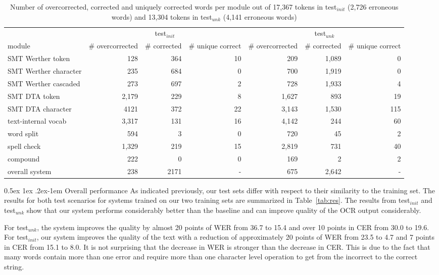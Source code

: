 \documentclass[11pt,letterpaper]{article}
\makeatletter
\renewcommand{\paragraph}{%
  \@startsection{paragraph}{4}%
  {\z@}{0.5ex \@plus 1ex \@minus .2ex}{-1em}%
  {\normalfont\normalsize\bfseries}%
}
\makeatother
\begin{document}
\begin{table*}[h]
\begin{tiny}
\begin{tabular}{l|rrr|rrr}
& \multicolumn{3}{c|}{\small test$_{init}$}& \multicolumn{3}{c}{\small test$_{unk}$}\\
\small
module& \small \# overcorrected & \small\# corrected &\small \# unique correct&\small \# overcorrected &\small \# corrected &\small \# unique correct\\
\toprule
\tiny
SMT Werther token & 128 &  364& 10&209 &1,089 &0 \\
SMT Werther character  & 235 & 684 & 0 &700 & 1,919&0 \\
SMT Werther cascaded & 273 & 697 & 2 &728&1,933&4\\
SMT DTA token & 2,179 & 229 & 8 &1,627 & 893&19\\
SMT DTA character & 4121 & 372 & 22 &3,143 &1,530 &115\\
text-internal vocab & 3,317 & 131 & 16& 4,142 & 244&60\\
word split & 594 & 3 & 0 & 720& 45&2\\
spell check & 1,329 & 219 & 15 &2,819 & 731&40\\
compound & 222 & 0 & 0 &169&2&2\\
\midrule
overall system  & 238 & 2171 & - & 675 & 2,642 & - \\
\bottomrule
\end{tabular} 
\caption{Number of overcorrected, corrected and uniquely corrected words per module out of 17,367 tokens in test$_{init}$ (2,726 erroneous words) and 13,304 tokens in test$_{unk}$ (4,141 erroneous words)}
\label{tab:evalothermod}
\end{tiny}
\end{table*}

\noindent
\paragraph{Overall performance}
As indicated previously, our test sets differ with respect to their similarity to the training set. The results for both test scenarios for systems trained on our two training sets are summarized in Table~\ref{tab:res}.
The results from test$_{init}$ and test$_{unk}$ show that our system performs considerably better than the baseline and can improve quality of the OCR output considerably. 

For test$_{unk}$, the system improves the quality by almost 20 points of WER from 36.7 to 15.4 and over 10 points in CER from 30.0 to 19.6.
For test$_{init}$, our system improves the quality of the text with a reduction of approximately 20 points of WER from 23.5 to 4.7 and 7 points in CER from 15.1 to 8.0. It is not surprising that the decrease in WER is stronger than the decrease in CER. This is due to the fact that many words contain more than one error and require more than one character level operation to get from the incorrect to the correct string.
\end{document}
